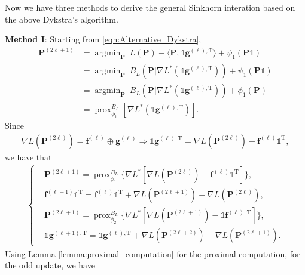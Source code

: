 \documentclass[11pt]{book}
\newcommand{\prox}{\operatorname{prox}}
\begin{document}
Now we have three methods to derive the general Sinkhorn interation based on the above Dykstra's algorithm.

{\bf Method I}: Starting from \eqref{eqn:Alternative_Dykstra}, 
\begin{align*}
    \mathbf{P}^{(2\ell+1)} &= \operatorname{argmin}_{\mathbf{P}} \ L(\mathbf{P}) - \langle \mathbf{P}, \mathbb{1}\mathbf{g}^{(\ell),\mathrm{T}} \rangle + \psi_1(\mathbf{P}\mathbb{1}) \\
    &= \operatorname{argmin}_{\mathbf{P}} \ B_L \left(\mathbf{P}|\nabla L^*( \mathbb{1}\mathbf{g}^{(\ell),\mathrm{T}} ) \right) + \psi_1(\mathbf{P}\mathbb{1}) \\
    &= \operatorname{argmin}_{\mathbf{P}} \ B_L \left(\mathbf{P}|\nabla L^*( \mathbb{1}\mathbf{g}^{(\ell),\mathrm{T}} ) \right) + \phi_1(\mathbf{P}) \\
    &= \prox_{\phi_1}^{B_L} \left[  \nabla L^*( \mathbb{1}\mathbf{g}^{(\ell),\mathrm{T}} ) \right].
\end{align*}
Since
\begin{align*}
    \nabla L (\mathbf{P}^{(2\ell)}) = \mathbf{f}^{(\ell)}\oplus\mathbf{g}^{(\ell)} \Longrightarrow
    \mathbb{1}\mathbf{g}^{(\ell),\mathrm{T}} = \nabla L (\mathbf{P}^{(2\ell)}) - \mathbf{f}^{(\ell)}\mathbb{1}^{\mathrm{T}},
\end{align*}
we have that
\begin{align}\label{eqn:Alternative_Dykstra02}
    \begin{cases}
        &\mathbf{P}^{(2\ell+1)} = \prox_{\phi_1}^{B_L} \Big\{ \nabla L^* \left[  \nabla L (\mathbf{P}^{(2\ell)}) - \mathbf{f}^{(\ell)}\mathbb{1}^{\mathrm{T}} \right] \Big\},\\
        & \mathbf{f}^{(\ell+1)}\mathbb{1}^{\mathrm{T}} = \mathbf{f}^{(\ell)}\mathbb{1}^{\mathrm{T}} + \nabla L(\mathbf{P}^{(2\ell+1)}) - \nabla L(\mathbf{P}^{(2\ell)}),\\
        &\mathbf{P}^{(2\ell+1)} = \prox_{\phi_2}^{B_L} \Big\{ \nabla L^* \left[  \nabla L (\mathbf{P}^{(2\ell+1)}) - \mathbb{1}\mathbf{f}^{(\ell),\mathrm{T}} \right] \Big\},\\
        & \mathbb{1}\mathbf{g}^{(\ell+1),\mathrm{T}} = \mathbb{1}\mathbf{g}^{(\ell),\mathrm{T}} + \nabla L(\mathbf{P}^{(2\ell+2)}) - \nabla L(\mathbf{P}^{(2\ell+1)}).
    \end{cases}
\end{align}
Using Lemma \ref{lemma:proximal_computation} for the proximal computation, for the odd update, we have
\end{document}

